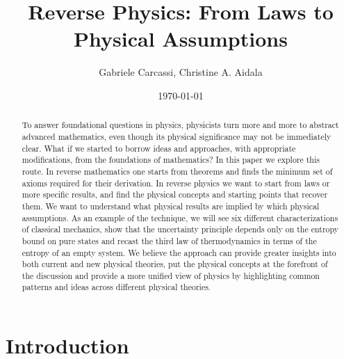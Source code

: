 \documentclass[10pt,twocolumn, nofootinbib]{revtex4-2}
\begin{document}
\title{Reverse Physics: From Laws to Physical Assumptions}
\author{Gabriele Carcassi, Christine A. Aidala}

\date{\today}


\begin{abstract}
To answer foundational questions in physics, physicists turn more and more to abstract advanced mathematics, even though its physical significance may not be immediately clear. What if we started to borrow ideas and approaches, with appropriate modifications, from the foundations of mathematics? In this paper we explore this route. In reverse mathematics\cite{friedman1976systems,simpson2017reverse,stillwellreverse} one starts from theorems and finds the minimum set of axioms required for their derivation. In reverse physics we want to start from laws or more specific results, and find the physical concepts and starting points that recover them. We want to understand what physical results are implied by which physical assumptions. As an example of the technique, we will see six different characterizations of classical mechanics, show that the uncertainty principle depends only on the entropy bound on pure states and recast the third law of thermodynamics in terms of the entropy of an empty system. We believe the approach can provide greater insights into both current and new physical theories, put the physical concepts at the forefront of the discussion and provide a more unified view of physics by highlighting common patterns and ideas across different physical theories.
\end{abstract}

\maketitle

\section{Introduction}

%	
\end{document}
